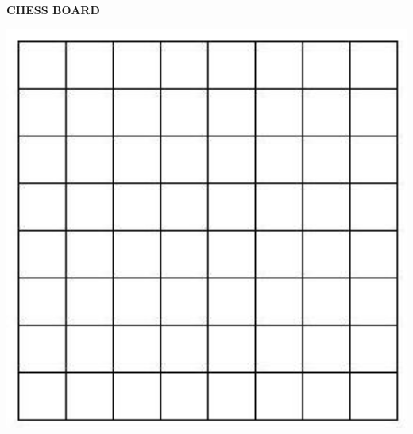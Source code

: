 \documentclass[11pt]{article}
\begin{document}
{\bfseries CHESS BOARD}


\begin{center}
\includegraphics[width=1.0\textwidth]{chess.jpg}
\end{center}
\end{document}
